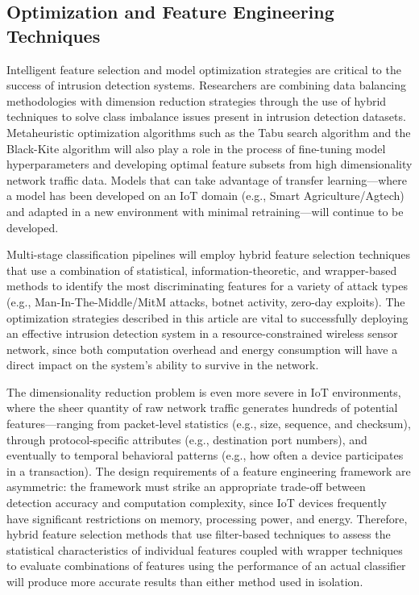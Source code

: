 \documentclass[12pt]{article}
\begin{document}
\subsection{Optimization and Feature Engineering Techniques}
Intelligent feature selection and model optimization strategies are critical to the success of intrusion detection systems. Researchers are combining data balancing methodologies with dimension reduction strategies through the use of hybrid techniques to solve class imbalance issues present in intrusion detection datasets. Metaheuristic optimization algorithms such as the Tabu search algorithm and the Black-Kite algorithm will also play a role in the process of fine-tuning model hyperparameters and developing optimal feature subsets from high dimensionality network traffic data. Models that can take advantage of transfer learning—where a model has been developed on an IoT domain (e.g., Smart Agriculture/Agtech) and adapted in a new environment with minimal retraining—will continue to be developed.

Multi-stage classification pipelines will employ hybrid feature selection techniques that use a combination of statistical, information-theoretic, and wrapper-based methods to identify the most discriminating features for a variety of attack types (e.g., Man-In-The-Middle/MitM attacks, botnet activity, zero-day exploits). The optimization strategies described in this article are vital to successfully deploying an effective intrusion detection system in a resource-constrained wireless sensor network, since both computation overhead and energy consumption will have a direct impact on the system's ability to survive in the network.

The dimensionality reduction problem is even more severe in IoT environments, where the sheer quantity of raw network traffic generates hundreds of potential features—ranging from packet-level statistics (e.g., size, sequence, and checksum), through protocol-specific attributes (e.g., destination port numbers), and eventually to temporal behavioral patterns (e.g., how often a device participates in a transaction). The design requirements of a feature engineering framework are asymmetric: the framework must strike an appropriate trade-off between detection accuracy and computation complexity, since IoT devices frequently have significant restrictions on memory, processing power, and energy. Therefore, hybrid feature selection methods that use filter-based techniques to assess the statistical characteristics of individual features coupled with wrapper techniques to evaluate combinations of features using the performance of an actual classifier will produce more accurate results than either method used in isolation.
\end{document}
